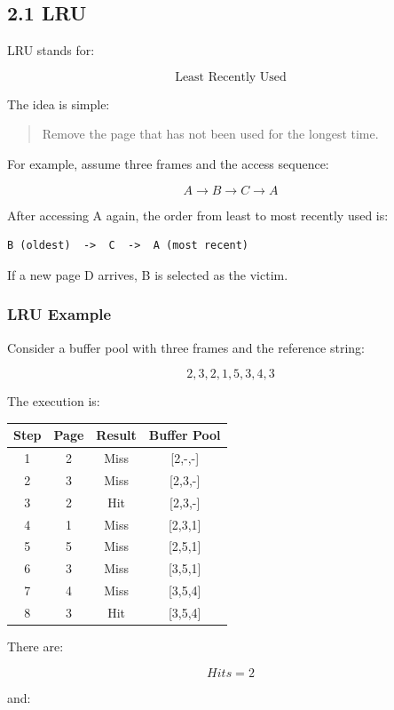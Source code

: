 \documentclass[12pt,a4paper]{article}
\begin{document}
\subsection{2.1 LRU}

LRU stands for:

\[
\boxed{\text{Least Recently Used}}
\]

The idea is simple:

\begin{quote}
Remove the page that has not been used for the longest time.
\end{quote}

For example, assume three frames and the access sequence:

\[
A \rightarrow B \rightarrow C \rightarrow A
\]

After accessing A again, the order from least to most recently used is:

\begin{verbatim}
B (oldest)  ->  C  ->  A (most recent)
\end{verbatim}

If a new page D arrives, B is selected as the victim.

\subsubsection{LRU Example}

Consider a buffer pool with three frames and the reference string:

\[
2,3,2,1,5,3,4,3
\]

The execution is:

\begin{longtable}{c|c|c|c}
\toprule
Step & Page & Result & Buffer Pool \\
\midrule
1 & 2 & Miss & [2,-,-] \\
2 & 3 & Miss & [2,3,-] \\
3 & 2 & Hit & [2,3,-] \\
4 & 1 & Miss & [2,3,1] \\
5 & 5 & Miss & [2,5,1] \\
6 & 3 & Miss & [3,5,1] \\
7 & 4 & Miss & [3,5,4] \\
8 & 3 & Hit & [3,5,4] \\
\bottomrule
\end{longtable}

There are:

\[
Hits = 2
\]

and:
\end{document}
